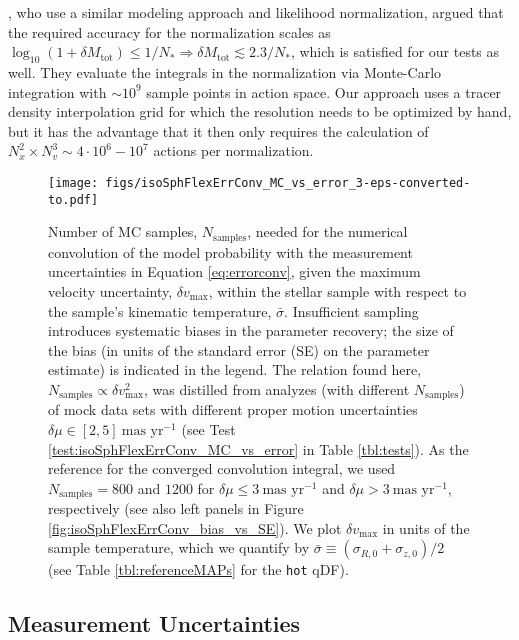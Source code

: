 \documentclass[iop,revtex4,numberedappendix,appendixfloats]{emulateapj}
\begin{document}
\citet{2013MNRAS.433.1411M}, who use a similar modeling approach and likelihood normalization, argued that the required accuracy for the normalization scales as $\log_{10} \left(1+\delta M_\text{tot} \right) \leq 1 / N_* \Rightarrow \delta M_\text{tot} \lesssim 2.3/N_*$, which is satisfied for our tests as well. They evaluate the integrals in the normalization via Monte-Carlo integration with $\sim 10^9$ sample points in action space. Our approach uses a tracer density interpolation grid for which the resolution needs to be optimized by hand, but it has the advantage that it then only requires the calculation of $N_x^2 \times N_v^3 \sim 4\cdot 10^{6} - 10^7$ actions per normalization.

\begin{figure}[!htbp]
\centering
\texttt{[image: figs/isoSphFlexErrConv\_MC\_vs\_error\_3-eps-converted-to.pdf]}
\caption{Number of MC samples, $N_\text{samples}$, needed for the numerical convolution of the model probability with the measurement uncertainties in Equation \eqref{eq:errorconv}, given the maximum velocity uncertainty, $\delta v_\text{max}$, within the stellar sample with respect to the sample's kinematic temperature, $\bar{\sigma}$. Insufficient sampling introduces systematic biases in the parameter recovery; the size of the bias (in units of the standard error (SE) on the parameter estimate) is indicated in the legend. The relation found here, $N_\text{samples} \propto \delta v_\text{max}^2$, was distilled from analyzes (with different $N_\text{samples}$) of mock data sets with different proper motion uncertainties $\delta \mu \in [2,5]~\text{mas yr}^{-1}$ (see Test \ref{test:isoSphFlexErrConv_MC_vs_error} in Table \ref{tbl:tests}). As the reference for the converged convolution integral, we used $N_\text{samples} = 800$ and $1200$ for $\delta \mu \leq 3~\text{mas yr}^{-1}$ and $\delta \mu > 3~\text{mas yr}^{-1}$, respectively (see also left panels in Figure \ref{fig:isoSphFlexErrConv_bias_vs_SE}). We plot $\delta v_\text{max}$ in units of the sample temperature, which we quantify by $\bar{\sigma} \equiv (\sigma_{R,0} + \sigma_{z,0})/2$ (see Table \ref{tbl:referenceMAPs} for the \texttt{hot} qDF).}
\label{fig:isoSphFlexErrConv_MC_vs_error}
\end{figure}

\subsection{Measurement Uncertainties}
\end{document}
